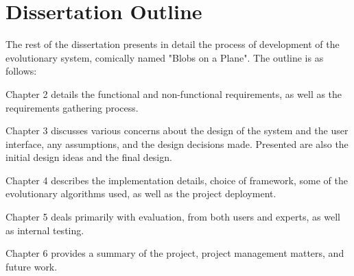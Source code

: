 \section{Dissertation Outline}
The rest of the dissertation presents in detail the process of development of the evolutionary system, comically named "Blobs on a Plane". The outline is as follows:

Chapter 2 details the functional and non-functional requirements, as well as the requirements gathering process.

Chapter 3 discusses various concerns about the design of the system and the user interface, any assumptions, and the design decisions made. Presented are also the initial design ideas and the final design.

Chapter 4 describes the implementation details, choice of framework, some of the evolutionary algorithms used, as well as the project deployment.

Chapter 5 deals primarily with evaluation, from both users and experts, as well as internal testing.

Chapter 6 provides a summary of the project, project management matters, and future work.